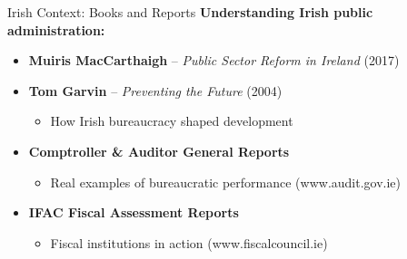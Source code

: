 \documentclass[10pt]{beamer}
\begin{document}
\begin{frame}{Irish Context: Books and Reports}
\textbf{Understanding Irish public administration:}
\begin{itemize}
\item \textbf{Muiris MacCarthaigh} – \emph{Public Sector Reform in Ireland} (2017)
\item \textbf{Tom Garvin} – \emph{Preventing the Future} (2004)
\begin{itemize}
\item How Irish bureaucracy shaped development
\end{itemize}
\item \textbf{Comptroller \& Auditor General Reports}
\begin{itemize}
\item Real examples of bureaucratic performance (www.audit.gov.ie)
\end{itemize}
\item \textbf{IFAC Fiscal Assessment Reports}
\begin{itemize}
\item Fiscal institutions in action (www.fiscalcouncil.ie)
\end{itemize}
\end{itemize}
\end{frame}
\end{document}
